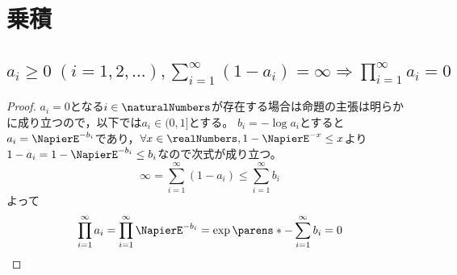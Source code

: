 \chapter{乗積}
    \section{\texorpdfstring{$a_i\geq 0\;(i=1,2,\dotsc),\sum_{i=1}^\infty (1-a_i) = \infty \Rightarrow \prod_{i=1}^\infty a_i = 0$}{a\_i≤0 (i=1,2,...), Σ\_\{i=1\}\string^∞ (1-a\_i) = ∞ ⇒ Π\_\{i=1\}\string^∞ a\_i = 0}}
        \begin{proof}
            $a_i=0$となる$i\in\naturalNumbers$が存在する場合は命題の主張は明らかに成り立つので，以下では$a_i\in(0,1]$とする。
            $b_i=-\log a_i$とすると$a_i=\NapierE^{-b_i}$であり，$\forall x\in\realNumbers,1-\NapierE^{-x}\leq x$より$1-a_i=1-\NapierE^{-b_i}\leq b_i$なので次式が成り立つ。
            \[ \infty = \sum_{i=1}^\infty (1-a_i) \leq \sum_{i=1}^\infty b_i \]
            よって
            \[ \prod_{i=1}^\infty a_i = \prod_{i=1}^\infty \NapierE^{-b_i} = \exp\parens*{-\sum_{i=1}^\infty b_i} = 0 \]
        \end{proof}
